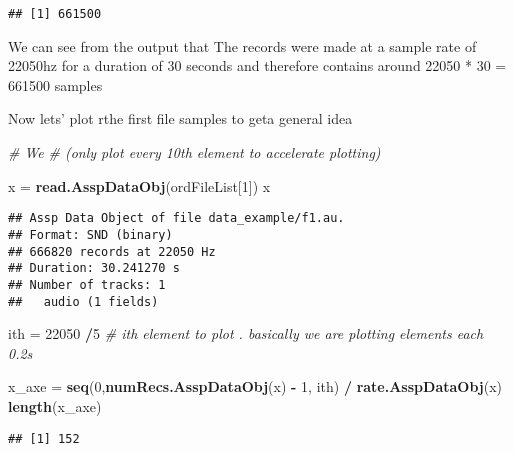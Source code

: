 \documentclass[]{article}
\newenvironment{Shaded}{\begin{snugshade}}{\end{snugshade}}
\newcommand{\KeywordTok}[1]{\textcolor[rgb]{0.13,0.29,0.53}{\textbf{#1}}}
\newcommand{\DecValTok}[1]{\textcolor[rgb]{0.00,0.00,0.81}{#1}}
\newcommand{\StringTok}[1]{\textcolor[rgb]{0.31,0.60,0.02}{#1}}
\newcommand{\CommentTok}[1]{\textcolor[rgb]{0.56,0.35,0.01}{\textit{#1}}}
\newcommand{\OtherTok}[1]{\textcolor[rgb]{0.56,0.35,0.01}{#1}}
\newcommand{\OperatorTok}[1]{\textcolor[rgb]{0.81,0.36,0.00}{\textbf{#1}}}
\newcommand{\NormalTok}[1]{#1}
\begin{document}
\begin{verbatim}
## [1] 661500
\end{verbatim}

We can see from the output that The records were made at a sample rate
of 22050hz for a duration of 30 seconds and therefore contains around
22050 * 30 = 661500 samples

Now lets' plot rthe first file samples to geta general idea

\begin{Shaded}
\begin{Highlighting}[]
\CommentTok{# We }
\CommentTok{# (only plot every 10th element to accelerate plotting)}

\NormalTok{x =}\StringTok{ }\KeywordTok{read.AsspDataObj}\NormalTok{(ordFileList[}\DecValTok{1}\NormalTok{])}
\NormalTok{x}
\end{Highlighting}
\end{Shaded}

\begin{verbatim}
## Assp Data Object of file data_example/f1.au.
## Format: SND (binary)
## 666820 records at 22050 Hz
## Duration: 30.241270 s
## Number of tracks: 1 
##   audio (1 fields)
\end{verbatim}

\begin{Shaded}
\begin{Highlighting}[]
\NormalTok{ith =}\StringTok{ }\DecValTok{22050} \OperatorTok{/}\DecValTok{5} \CommentTok{# ith element to plot . basically we are plotting elements each 0.2s}

\NormalTok{x_axe =}\StringTok{ }\KeywordTok{seq}\NormalTok{(}\DecValTok{0}\NormalTok{,}\KeywordTok{numRecs.AsspDataObj}\NormalTok{(x) }\OperatorTok{-}\StringTok{ }\DecValTok{1}\NormalTok{, ith) }\OperatorTok{/}\StringTok{ }\KeywordTok{rate.AsspDataObj}\NormalTok{(x)}
\KeywordTok{length}\NormalTok{(x_axe)}
\end{Highlighting}
\end{Shaded}

\begin{verbatim}
## [1] 152
\end{verbatim}

\begin{Shaded}
\end{Shaded}
\end{document}
